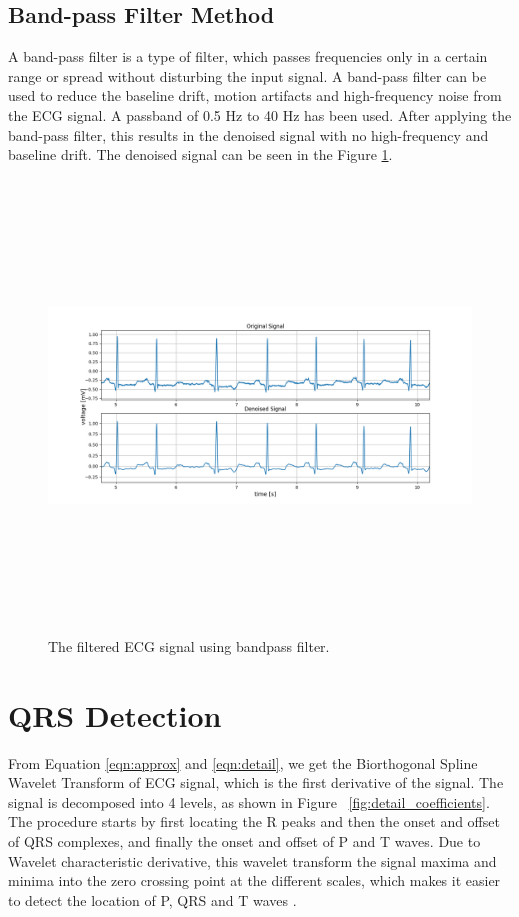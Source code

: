 \subsection{Band-pass Filter Method}
A band-pass filter is a type of filter, which passes frequencies only in a certain range or spread without disturbing the input signal. A band-pass filter can be used to reduce the baseline drift, motion artifacts and high-frequency noise from the ECG signal. A passband of 0.5 Hz to 40 Hz has been used. After applying the band-pass filter, this results in the denoised signal with no high-frequency and baseline drift. The denoised signal can be seen in the Figure \ref{fig:bandpass_denoised}. 

\begin{figure}[h]
	\centering
	\includegraphics[width=15cm,height=12cm,keepaspectratio=true]{images/bandpass_denoised_1}
	\caption{
		The filtered ECG signal using bandpass filter.
	}
	\label{fig:bandpass_denoised}
\end{figure}


\section{QRS Detection}\label{sec:ecg_det}

From Equation \ref{eqn:approx} and \ref{eqn:detail}, we get the Biorthogonal Spline Wavelet Transform of ECG signal, which is the first derivative of the signal. The signal is decomposed into 4 levels, as shown in  Figure ~\ref{fig:detail_coefficients}. The procedure starts by first locating the R peaks and then the onset and offset of QRS complexes, and finally the onset and offset of P and T waves. Due to Wavelet characteristic derivative, this wavelet transform the signal maxima and minima into the zero crossing point at the different scales, which makes it easier to detect the location of P, QRS and T waves \cite{e2010cardiac}.


